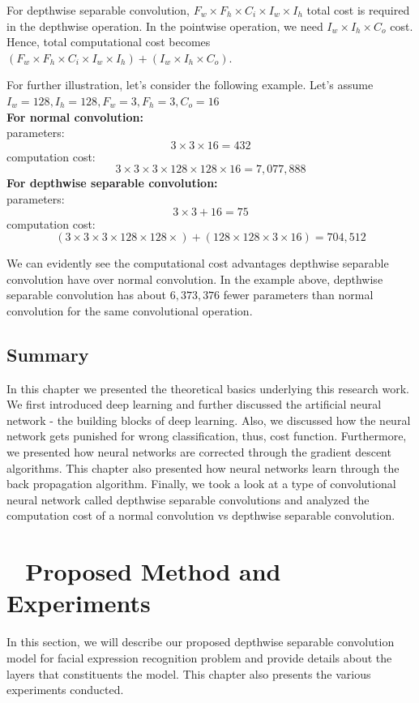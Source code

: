 \documentclass[master]{thesis-uestc}
\begin{document}
For depthwise separable convolution, $F_w \times F_h \times C_i \times I_w \times I_h$ total cost is required in the depthwise operation. In the pointwise operation, we need $I_w \times I_h \times C_o$ cost. Hence, total computational cost becomes $(F_w \times F_h \times C_i \times I_w \times I_h) + (I_w \times I_h \times C_o)$.

For further illustration, let's consider the following example. Let's assume $I_w = 128, I_h = 128, F_w = 3, F_h = 3, C_o = 16$ \\
\textbf{For normal convolution:} \\
parameters:
\[3 \times 3 \times 16 = 432\]
computation cost:
\[3 \times 3 \times 3 \times 128 \times 128 \times 16 = 7,077,888 \]
\textbf{For depthwise separable convolution:}\\
parameters:
\[3 \times 3 + 16 = 75 \]
computation cost:
\[(3 \times 3 \times 3 \times 128 \times 128 \times) + (128 \times 128 \times 3 \times 16) = 704,512 \]

We can evidently see the computational cost advantages depthwise separable convolution have over normal convolution. In the example above, depthwise separable convolution has about $6,373,376$ fewer parameters than normal convolution for the same convolutional operation.


\section{Summary}
In this chapter we presented the theoretical basics underlying this research work. We first introduced deep learning and further discussed the artificial neural network - the building blocks of deep learning. Also, we discussed how the neural network gets punished for wrong classification, thus, cost function. Furthermore, we presented how neural networks are corrected through the gradient descent algorithms. This chapter also presented how neural networks learn through the back propagation algorithm. Finally, we took a look at a type of convolutional neural network called depthwise separable convolutions and analyzed the computation cost of a normal convolution vs depthwise separable convolution.



\chapter{\,\,\,\,\,\textbf{Proposed Method and Experiments}}
In this section, we will describe our proposed depthwise separable convolution model for facial expression recognition problem and provide details about the layers that constituents the model. This chapter also presents the various experiments conducted.
\end{document}
